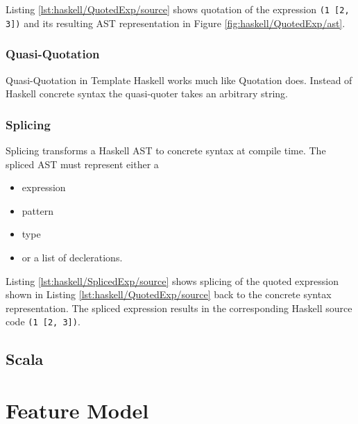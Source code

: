 Listing \ref{lst:haskell/QuotedExp/source} shows quotation of the expression \lstinline{(1 [2, 3])} and its resulting AST representation in Figure \ref{fig:haskell/QuotedExp/ast}.


\subsubsection{Quasi-Quotation}

Quasi-Quotation in Template Haskell works much like Quotation does.
Instead of Haskell concrete syntax the quasi-quoter takes an arbitrary string.

\subsubsection{Splicing}

Splicing transforms a Haskell AST to concrete syntax at compile time.
The spliced AST must represent either a
\begin{itemize}
	\item expression
	\item pattern
	\item type
	\item or a list of declerations.
\end{itemize}



Listing \ref{lst:haskell/SplicedExp/source} shows splicing of the quoted expression shown in Listing \ref{lst:haskell/QuotedExp/source} back to the concrete syntax representation.
The spliced expression results in the corresponding Haskell source code \lstinline{(1 [2, 3])}.

\subsection{Scala}


\section{Feature Model}


